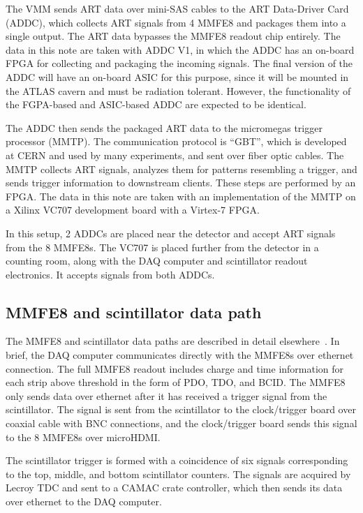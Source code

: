 The VMM sends ART data over mini-SAS cables to the ART Data-Driver Card (ADDC), which collects ART signals from 4 MMFE8 and packages them into a single output. The ART data bypasses the MMFE8 readout chip entirely. The data in this note are taken with ADDC V1, in which the ADDC has an on-board FPGA for collecting and packaging the incoming signals. The final version of the ADDC will have an on-board ASIC for this purpose, since it will be mounted in the ATLAS cavern and must be radiation tolerant. However, the functionality of the FGPA-based and ASIC-based ADDC are expected to be identical.

The ADDC then sends the packaged ART data to the micromegas trigger processor (MMTP). The communication protocol is ``GBT'', which is developed at CERN and used by many experiments, and sent over fiber optic cables. The MMTP collects ART signals, analyzes them for patterns resembling a trigger, and sends trigger information to downstream clients. These steps are performed by an FPGA. The data in this note are taken with an implementation of the MMTP on a Xilinx VC707 development board with a Virtex-7 FPGA.

In this setup, 2 ADDCs are placed near the detector and accept ART signals from the 8 MMFE8s. The VC707 is placed further from the detector in a counting room, along with the DAQ computer and scintillator readout electronics. It accepts signals from both ADDCs.

\subsection{MMFE8 and scintillator data path}
\label{sec:exp-mmfe}

The MMFE8 and scintillator data paths are described in detail elsewhere~\cite{noisy,noiseless}. In brief, the DAQ computer communicates directly with the MMFE8s over ethernet connection. The full MMFE8 readout includes charge and time information for each strip above threshold in the form of PDO, TDO, and BCID. The MMFE8 only sends data over ethernet after it has received a trigger signal from the scintillator. The signal is sent from the scintillator to the clock/trigger board over coaxial cable with BNC connections, and the clock/trigger board sends this signal to the 8 MMFE8s over microHDMI.

The scintillator trigger is formed with a coincidence of six signals corresponding to the top, middle, and bottom scintillator counters. The signals are acquired by Lecroy TDC and sent to a CAMAC crate controller, which then sends its data over ethernet to the DAQ computer.

